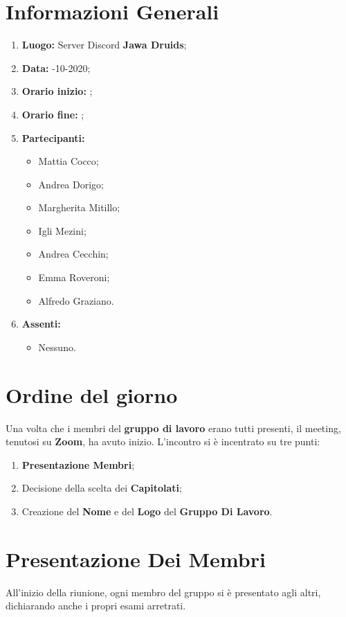 	\newpage
	\section{Informazioni Generali}
	\begin{enumerate}
		\item \textbf{Luogo:} \normalfont Server Discord \textbf{Jawa Druids};
		\item \textbf{Data:} -10-2020;
		\item \textbf{Orario inizio:} ;
		\item \textbf{Orario fine:} ;
		\item \textbf{Partecipanti:}
		\begin{itemize}
			\item Mattia Cocco;
			\item Andrea Dorigo;
			\item Margherita Mitillo;
			\item Igli Mezini;
			\item Andrea Cecchin;
			\item Emma Roveroni;
			\item Alfredo Graziano.
		\end{itemize}
		\item \textbf{Assenti:}
		\begin{itemize}
			\item Nessuno.
		\end{itemize}
	\end{enumerate}
	\section{Ordine del giorno}
	Una volta che i membri del \textbf{gruppo di lavoro} erano tutti presenti, il meeting, tenutosi su \textbf{Zoom}, ha avuto inizio.
	L'incontro si è incentrato su tre punti:
	\begin{enumerate}
		\item \textbf{Presentazione Membri};		
		\item Decisione della scelta dei \textbf{Capitolati};
		\item Creazione del \textbf{Nome} e del \textbf{Logo} del \textbf{Gruppo Di Lavoro}.
	\end{enumerate}

	\section{Presentazione Dei Membri}
	All'inizio della riunione, ogni membro del gruppo si è presentato agli altri, dichiarando anche i propri esami arretrati.

